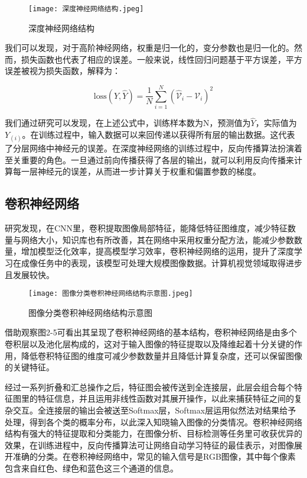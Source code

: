 \begin{figure}[hbt]
	\centering
	\texttt{[image: 深度神经网络结构.jpeg]}
	\caption{深度神经网络结构}
	\label{f.example}
\end{figure}

我们可以发现，对于高阶神经网络，权重是归一化的，变分参数也是归一化的。然而，损失函数也代表了相应的误差。一般来说，线性回归问题基于平方误差，平方误差被视为损失函数，解释为：

\[
\text{loss}(Y, \hat{Y}) = \frac{1}{N} \sum_{i=1}^{N} \left( \hat{\mathcal{V}}_i - \mathcal{V}_i \right)^2
\]

我们通过研究可以发现，在上述公式中，训练样本数为N，预测值为$\hat{Y}$，实际值为$Y_(i)$。在训练过程中，输入数据可以来回传递以获得所有层的输出数据。这代表了分层网络中神经元的误差。在深度神经网络的训练过程中，反向传播算法扮演着至关重要的角色。一旦通过前向传播获得了各层的输出，就可以利用反向传播来计算每一层神经元的误差，从而进一步计算关于权重和偏置参数的梯度。

\subsection{卷积神经网络}

研究发现，在CNN里，卷积提取图像局部特征，能降低特征图维度，减少特征数量与网络大小，知识库也有所改善，其在网络中采用权重分配方法，能减少参数数量，增加模型泛化效率，提高模型学习效率，卷积神经网络的运用，提升了深度学习在成像任务中的表现，该模型可处理大规模图像数据。计算机视觉领域取得进步且发展较快。
\begin{figure}[hbt]
	\centering
	\texttt{[image: 图像分类卷积神经网络结构示意图.jpeg]}
	\caption{图像分类卷积神经网络结构示意图}
	\label{f.example}
\end{figure}

借助观察图2-5可看出其呈现了卷积神经网络的基本结构，卷积神经网络是由多个卷积层以及池化层构成的，这对于输入图像的特征提取以及降维起着十分关键的作用，降低卷积特征图的维度可减少参数数量并且降低计算复杂度，还可以保留图像的关键特征。

经过一系列折叠和汇总操作之后，特征图会被传送到全连接层，此层会组合每个特征图里的特征信息，并且运用非线性函数对其展开操作，以此来捕获特征之间的复杂交互。全连接层的输出会被送至Softmax层，Softmax层运用似然法对结果给予处理，得到各个类的概率分布，以此深入知晓输入图像的分类情况。卷积神经网络结构有强大的特征提取和分类能力，在图像分析、目标检测等任务里可收获优异的效果，在训练进程中，反向传播算法可让网络自动学习特征的最佳表示，对图像展开准确的分类。在卷积神经网络中，常见的输入信号是RGB图像，其中每个像素包含来自红色、绿色和蓝色这三个通道的信息。

